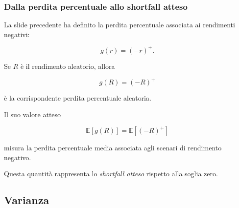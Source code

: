 \documentclass[handout]{beamer}%
\providecommand{\E}{\mathbb{E}}
\providecommand{\1}{\mathbf{1}}
\providecommand{\QTR}[2]{\csname #1\endcsname{#2}}
\begin{document}
%

\begin{frame}%
%

\frametitle{Dalla perdita percentuale allo shortfall atteso}%


La slide precedente ha definito la perdita percentuale associata ai rendimenti negativi:%

\[
g(r)=(-r)^{+}.
\]


Se $R$ \`{e} il rendimento aleatorio, allora%

\[
g(R)=(-R)^{+}
\]


\`{e} la corrispondente perdita percentuale aleatoria.

\medskip

Il suo valore atteso%

\[
\E[g(R)] = \E[(-R)^+]
\]


misura la perdita percentuale media associata agli scenari di rendimento negativo.

\medskip

Questa quantit\`{a} rappresenta lo \emph{shortfall atteso} rispetto alla
soglia zero.







%

\transboxout
\end{frame}%




\subsection{Varianza}%
\end{document}
